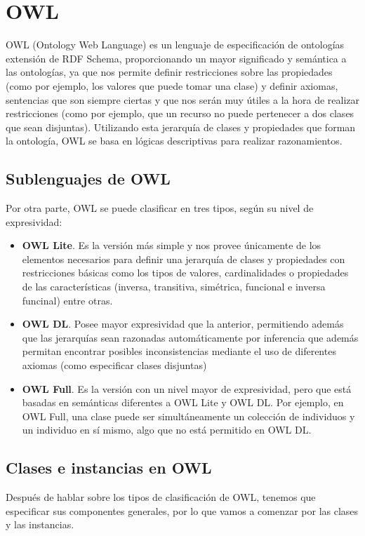 \newpage
\section{OWL}

{\sf OWL} ({\sf Ontology Web Language}) es un lenguaje de especificación de ontologías extensión de {\sf RDF Schema}, proporcionando un mayor significado y semántica a las ontologías, ya que nos permite definir restricciones sobre las propiedades (como por ejemplo, los valores que puede tomar una clase) y definir axiomas, sentencias que son siempre ciertas y que nos serán muy útiles a la hora de realizar restricciones (como por ejemplo, que un recurso no puede pertenecer a dos clases que sean disjuntas). Utilizando esta jerarquía de clases y propiedades que forman la ontología, {\sf OWL} se basa en lógicas descriptivas para realizar razonamientos.

\subsection{Sublenguajes de OWL}	
Por otra parte, {\sf OWL} se puede clasificar en tres tipos, según su nivel de expresividad:

\begin{itemize}
	\item \textbf{OWL Lite}. Es la versión más simple y nos provee únicamente de los elementos necesarios para definir una jerarquía de clases y propiedades con restricciones básicas como los tipos de valores, cardinalidades o propiedades de las características (inversa, transitiva, simétrica, funcional e inversa funcinal) entre otras.
	\item \textbf{OWL DL}. Posee mayor expresividad que la anterior, permitiendo además que las jerarquías sean razonadas automáticamente por inferencia que además permitan encontrar posibles inconsistencias mediante el uso de diferentes axiomas (como especificar clases disjuntas)
	\item \textbf{OWL Full}. Es la versión con un nivel mayor de expresividad, pero que está basadas en semánticas diferentes a {\sf OWL Lite} y {\sf OWL DL}. Por ejemplo, en {\sf OWL Full}, una clase puede ser simultáneamente un colección de individuos y un individuo en sí mismo, algo que no está permitido en {\sf OWL DL}.
\end{itemize}

\subsection{Clases e instancias en OWL}	
Después de hablar sobre los tipos de clasificación de {\sf OWL}, tenemos que especificar sus componentes generales, por lo que vamos a comenzar por las clases y las instancias.

